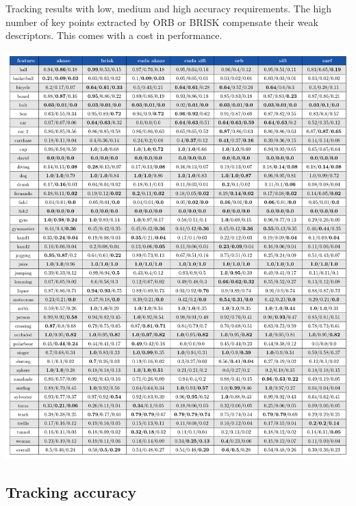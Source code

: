 \begin{table}[t]
\caption{Tracking results with low, medium and high accuracy requirements. The high number of key points extracted by ORB or BRISK compensate their weak descriptors. This comes with a cost in performance.} 
\centerline{%
		\includegraphics[width=\linewidth]{tables/tracking_precision.pdf}}
		\vspace{8mm}
	\label{table:taccuracy}
\end{table}


\subsection{Tracking accuracy}

